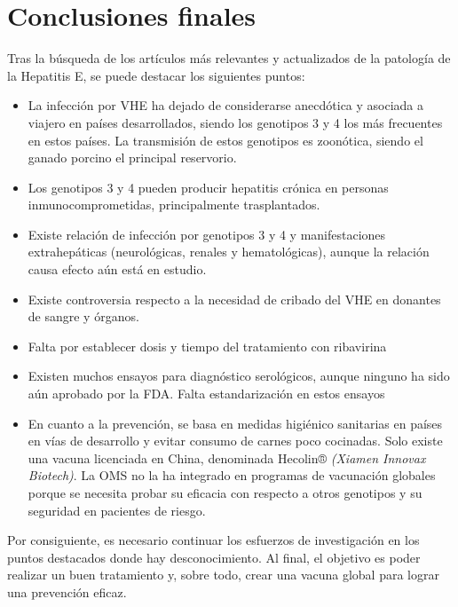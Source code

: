 \documentclass[11 pt]{article}
\begin{document}
\section{Conclusiones finales}
Tras la búsqueda de los artículos más relevantes y actualizados de la patología de la Hepatitis E, se puede destacar los siguientes puntos:
\begin{itemize}
	\item 
	La infección por VHE ha dejado de considerarse anecdótica y asociada a viajero en países desarrollados, siendo los genotipos 3 y 4 los más frecuentes en estos países. La transmisión de estos genotipos es zoonótica, siendo el ganado porcino el principal reservorio. 
	\item 
	Los genotipos 3 y 4 pueden producir hepatitis crónica en personas inmunocomprometidas, principalmente trasplantados.
	\item 
	Existe relación de infección por genotipos 3 y 4 y manifestaciones extrahepáticas (neurológicas, renales y hematológicas), aunque la relación causa efecto aún está en estudio.
	\item 
	Existe controversia respecto a la necesidad de cribado del VHE en donantes de sangre y órganos.
	\item 
	Falta por establecer dosis y tiempo del tratamiento con ribavirina
	\item 
	Existen muchos ensayos para diagnóstico serológicos, aunque ninguno ha sido aún aprobado por la FDA. Falta estandarización en estos ensayos
	\item 
	En cuanto a la prevención, se basa en medidas higiénico sanitarias en países en vías de desarrollo y evitar consumo de carnes poco cocinadas. Solo existe una vacuna licenciada en China, denominada Hecolin® {\em (Xiamen Innovax Biotech)}. La OMS no la ha integrado en programas de vacunación globales porque se necesita probar su eficacia con respecto a otros genotipos y su seguridad en pacientes de riesgo.
\end{itemize}
Por consiguiente, es necesario continuar los esfuerzos de investigación en los puntos destacados donde hay desconocimiento. Al final, el objetivo es poder realizar un buen tratamiento y, sobre todo, crear una vacuna global para lograr una prevención eficaz.
\end{document}
